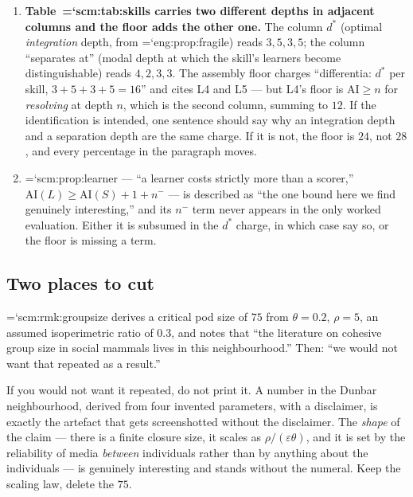 \documentclass[11pt,letterpaper]{article}
\newcommand{\loc}[1]{{\small\ttfamily\color{accent}\hyphenchar\font=`\-\relax #1}}
\newcommand{\fnd}[1]{\textbf{\color{warn}#1}}
\newcommand{\AI}{\mathrm{AI}}
\begin{document}
\begin{enumerate}[leftmargin=1.4em,itemsep=4pt]
\item \fnd{Table~\loc{scm:tab:skills} carries two different depths in
      adjacent columns and the floor adds the other one.} The column
      $d^\ast$ (optimal \emph{integration} depth, from
      \loc{eng:prop:fragile}) reads $3,5,3,5$; the column ``separates
      at'' (modal depth at which the skill's learners become
      distinguishable) reads $4,2,3,3$. The assembly floor charges
      ``differentia: $d^\ast$ per skill, $3+5+3+5 = 16$'' and cites L4
      and L5 --- but L4's floor is $\AI \ge n$ for \emph{resolving} at
      depth $n$, which is the second column, summing to $12$. If the
      identification is intended, one sentence should say why an
      integration depth and a separation depth are the same charge.
      If it is not, the floor is $24$, not $28$, and every percentage
      in the paragraph moves.
\item \loc{scm:prop:learner} --- ``a learner costs strictly more than a
      scorer,'' $\AI(L) \ge \AI(S) + 1 + n^{-}$ --- is described as
      ``the one bound here we find genuinely interesting,'' and its
      $n^{-}$ term never appears in the only worked evaluation. Either
      it is subsumed in the $d^\ast$ charge, in which case say so, or
      the floor is missing a term.
\end{enumerate}

\subsection*{Two places to cut}

\loc{scm:rmk:groupsize} derives a critical pod size of $75$ from
$\theta = 0.2$, $\rho = 5$, an assumed isoperimetric ratio of $0.3$,
and notes that ``the literature on cohesive group size in social
mammals lives in this neighbourhood.'' Then: ``we would not want that
repeated as a result.''

If you would not want it repeated, do not print it. A number in the
Dunbar neighbourhood, derived from four invented parameters, with a
disclaimer, is exactly the artefact that gets screenshotted without the
disclaimer. The \emph{shape} of the claim --- there is a finite closure
size, it scales as $\rho/(\varepsilon\theta)$, and it is set by the
reliability of media \emph{between} individuals rather than by
anything about the individuals --- is genuinely interesting and stands
without the numeral. Keep the scaling law, delete the $75$.
\end{document}
